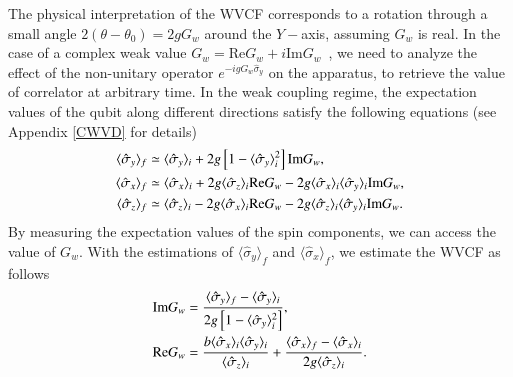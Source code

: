 \documentclass[twocolumn,pra,aps,superscriptaddress]{revtex4-2}
\begin{document}
The physical interpretation of the WVCF  corresponds to a rotation through a small angle $2(\theta-\theta_0)=2gG_w$ around the $Y-$axis, assuming $G_w$ is real. 
In the case of a complex weak value $G_w=\text{Re}G_w+i\text{Im}G_w$~\cite{jozsa}, we need to analyze the effect of the non-unitary operator $e^{-igG_w\hat{\sigma}_{y}}$ on the apparatus, to retrieve the value of correlator at arbitrary time. In the weak coupling regime, the expectation values of the qubit along different directions satisfy the following equations (see Appendix \ref{CWVD} for details)
\begin{align}
\label{eqn:complex}
\langle\hat{\sigma}_{y}\rangle _{f}& \simeq\langle \hat{\sigma}_{y}\rangle _{i}+2g\left[1-\langle \hat{\sigma}_{y}\rangle _{i}^{2}\right]\text{Im}G_w,
\notag\\
\langle \hat{\sigma}_{x}\rangle _{f}& \simeq\langle \hat{\sigma}_{x}\rangle _{i}+2g\langle \hat{\sigma}_{z}\rangle _{i}\text{Re}G_w-2g\langle \hat{\sigma}_{x}\rangle _{i}\langle \hat{\sigma}_{y}\rangle _{i}\text{Im}G_w,
\notag\\
\langle \hat{\sigma}_{z}\rangle _{f}& \simeq\langle \hat{\sigma}_{z}\rangle _{i}-2g\langle \hat{\sigma}_{x}\rangle _{i}\text{Re}G_w-2g\langle \hat{\sigma}_{z}\rangle _{i}\langle \hat{\sigma}_{y}\rangle _{i}\text{Im}G_w.
\end{align}
By measuring the expectation values of the spin components, we can access the value of $G_w$. With the estimations of $\langle\hat{\sigma}_y\rangle_f$ and $\langle\hat{\sigma}_x\rangle_f$, we estimate the WVCF as follows
\begin{align}
\label{ab}
\text{Im}G_w &= \frac{\langle\hat{\sigma}_y\rangle_f-\langle\hat{\sigma}_y\rangle_i}{2g\left[1-\langle\hat{\sigma}_y\rangle_i^2\right]},
\notag\\
\text{Re}G_w &= \frac{b\langle\hat{\sigma}_x\rangle_i\langle\hat{\sigma}_y\rangle_i}{\langle\hat{\sigma}_z\rangle_i} + \frac{\langle\hat{\sigma}_x\rangle_f-\langle\hat{\sigma}_x\rangle_i}{2g\langle\hat{\sigma}_z\rangle_i}.
\end{align}
\end{document}
